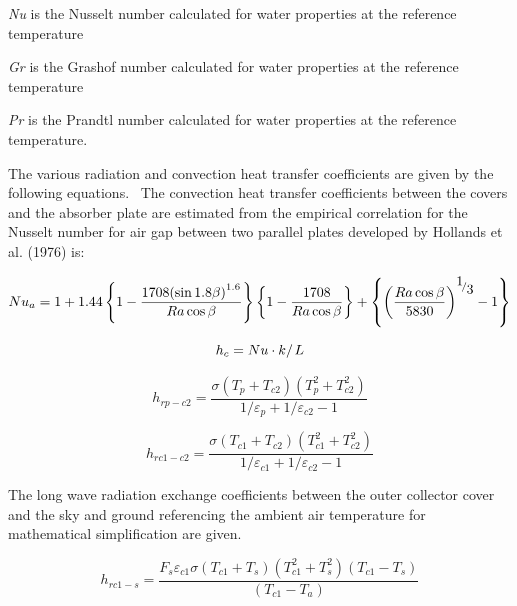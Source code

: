 \emph{Nu} is the Nusselt number calculated for water properties at the reference temperature

\emph{Gr} is the Grashof number calculated for water properties at the reference temperature

\emph{Pr} is the Prandtl number calculated for water properties at the reference temperature.

The various radiation and convection heat transfer coefficients are given by the following equations.~ The convection heat transfer coefficients between the covers and the absorber plate are estimated from the empirical correlation for the Nusselt number for air gap between two parallel plates developed by Hollands et al. (1976) is:

\begin{equation}
N{u_a} = 1 + 1.44\left\{ {1 - \frac{{1708{{\left( {\sin 1.8\beta } \right)}^{1.6}}}}{{Ra\cos \beta }}} \right\}{\left\{ {1 - \frac{{1708}}{{Ra\cos \beta }}} \right\}} + {\left\{ {{{\left( {\frac{{Ra\cos \beta }}{{5830}}} \right)}^{{\raise0.7ex\hbox{1} \!\mathord{\left/ {\vphantom {1 3}}\right.}\!\lower0.7ex\hbox{3}}}} - 1} \right\}}
\end{equation}

\begin{equation}
{h_c} = {{Nu \cdot k} \mathord{\left/ {\vphantom {{Nu \cdot k} L}} \right. } L}
\end{equation}

\begin{equation}
{h_{rp - c2}} = \frac{{\sigma \left( {{T_p} + {T_{c2}}} \right)\left( {T_p^2 + T_{c2}^2} \right)}}{{1/{\varepsilon_p} + 1/{\varepsilon_{c2}} - 1}}
\end{equation}

\begin{equation}
{h_{rc1 - c2}} = \frac{{\sigma \left( {{T_{c1}} + {T_{c2}}} \right)\left( {T_{c1}^2 + T_{c2}^2} \right)}}{{1/{\varepsilon_{c1}} + 1/{\varepsilon_{c2}} - 1}}
\end{equation}

The long wave radiation exchange coefficients between the outer collector cover and the sky and ground referencing the ambient air temperature for mathematical simplification are given.

\begin{equation}
{h_{rc1 - s}} = \frac{{{F_s}{\varepsilon_{c1}}\sigma \left( {{T_{c1}} + {T_s}} \right)\left( {T_{c1}^2 + T_s^2} \right)\left( {{T_{c1}} - {T_s}} \right)}}{{\left( {{T_{c1}} - {T_a}} \right)}}
\end{equation}

